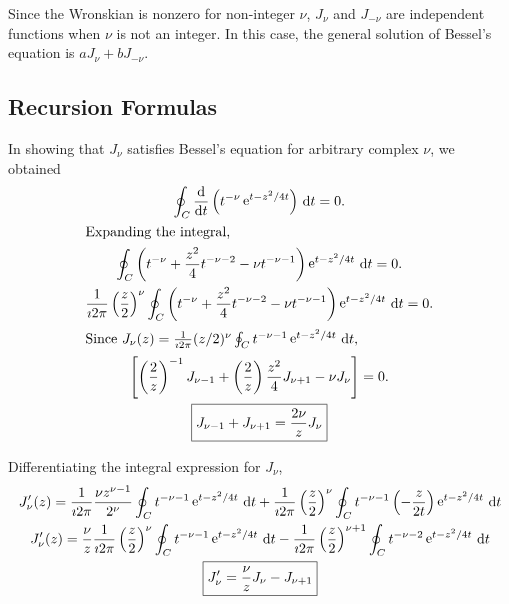 Since the Wronskian is nonzero for non-integer $\nu$, $J_\nu$ and $J_{-\nu}$
are independent functions when $\nu$ is not an integer.  In this case, the 
general solution of Bessel's equation is $a J_\nu + b J_{-\nu}$.  








\subsection{Recursion Formulas}

In showing that $J_\nu$ satisfies Bessel's equation for arbitrary complex 
$\nu$, we obtained 
\begin{gather*}
  \oint_C \frac{\mathrm{d}}{\mathrm{d} t} \left( t^{-\nu} \mathop{\mathrm{e}}\nolimits^{t - z^2/4t} \right)\,\mathrm{d} t = 0. 
  \\
  \intertext{Expanding the integral,}
  \oint_C \left( t^{-\nu} + \frac{z^2}{4} t^{-\nu-2} -\nu t^{-\nu-1} \right)
  \mathop{\mathrm{e}}\nolimits^{t-z^2/4t}\,\mathrm{d} t = 0. 
  \\
  \frac{1}{\imath 2 \pi} \left( \frac{z}{2} \right)^\nu 
  \oint_C \left( t^{-\nu} + \frac{z^2}{4} t^{-\nu-2} -\nu t^{-\nu-1} 
  \right) \mathop{\mathrm{e}}\nolimits^{t-z^2/4t}\,\mathrm{d} t = 0. 
  \\
  \intertext{Since $J_\nu(z) = \frac{1}{\imath 2 \pi} (z/2)^\nu \oint_C t^{-\nu-1} 
    \mathop{\mathrm{e}}\nolimits^{t-z^2/4t}\,\mathrm{d} t$,}
  \left[\left(\frac{2}{z}\right)^{-1} J_{\nu-1} + \left(\frac{2}{z}
    \right) \frac{z^2}{4} J_{\nu+1} - \nu J_\nu \right] = 0. 
  \\
  \boxed{
    J_{\nu-1} + J_{\nu+1} = \frac{2 \nu}{z} J_\nu 
    }
\end{gather*}

Differentiating the integral expression for $J_\nu$, 
\begin{gather*}
  J_\nu'(z) = \frac{1}{\imath 2 \pi} \frac{\nu z^{\nu-1}}{2^\nu} \oint_C t^{-\nu-1}\mathop{\mathrm{e}}\nolimits^{t-z^2/4t}\,\mathrm{d} t 
  + \frac{1}{\imath 2 \pi} \left(\frac{z}{2}\right)^\nu \oint_C 
  t^{-\nu-1} \left(-\frac{z}{2 t}\right) \mathop{\mathrm{e}}\nolimits^{t-z^2/4t}\,\mathrm{d} t 
  \\
  J_\nu'(z)= \frac{\nu}{z} \frac{1}{\imath 2 \pi} \left(\frac{z}{2}\right)^\nu 
  \oint_C t^{-\nu-1}\mathop{\mathrm{e}}\nolimits^{t-z^2/4t} \,\mathrm{d} t - 
  \frac{1}{\imath 2 \pi} \left(\frac{z}{2}\right)^{\nu+1} 
  \oint_C t^{-\nu-2}\mathop{\mathrm{e}}\nolimits^{t-z^2/4t} \,\mathrm{d} t 
  \\
  \boxed{ 
    J_\nu' = \frac{\nu}{z} J_\nu - J_{\nu+1} 
    }
\end{gather*}


